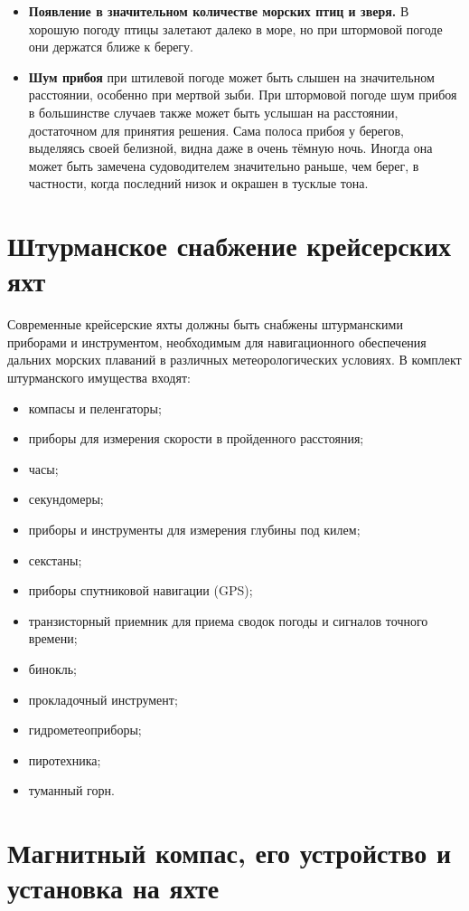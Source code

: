 \documentclass[a4paper, 12pt, twoside, final, book, russian, fittopage, cyremdash]{ncc}
\begin{document}
\begin{itemize}
\item \textbf{Появление в значительном количестве морских птиц и зверя.} В хорошую погоду птицы залетают далеко в море, но при штормовой погоде они держатся ближе к берегу. 
\item \textbf{Шум прибоя} при штилевой погоде может быть слышен на значительном расстоянии, особенно при мертвой зыби. При штормовой погоде шум прибоя в большинстве случаев также может быть услышан на расстоянии, достаточном для принятия решения. Сама полоса прибоя у берегов, выделяясь своей белизной, видна даже в очень тёмную ночь. Иногда она может быть замечена судоводителем значительно раньше, чем берег, в частности, когда последний низок и окрашен в тусклые тона. 
\end{itemize}

\section{Штурманское снабжение крейсерских яхт}

Современные крейсерские яхты должны быть снабжены штурманскими приборами и инструментом, необходимым для навигационного обеспечения дальних морских плаваний в различных метеорологических условиях. В комплект штурманского имущества входят: 

\begin{itemize}
\item компасы и пеленгаторы; 
\item приборы для измерения скорости в пройденного расстояния; 
\item часы; 
\item секундомеры; 
\item приборы и инструменты для измерения глубины под килем; 
\item секстаны; 
\item приборы спутниковой навигации (GPS); 
\item транзисторный приемник для приема сводок погоды и сигналов точного времени; 
\item бинокль; 
\item прокладочный инструмент; 
\item гидрометеоприборы; 
\item пиротехника; 
\item туманный горн. 
\end{itemize}

\section{Магнитный компас, его устройство и установка на яхте}
\end{document}

